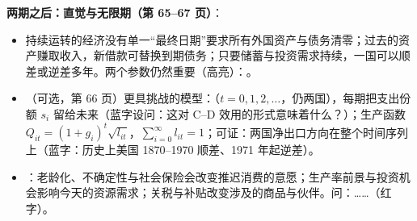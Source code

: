 \textbf{两期之后：直觉与无限期（第 65--67 页）}：
\begin{itemize}
  \item 持续运转的经济没有单一``最终日期''要求所有外国资产与债务清零；过去的资产赚取收入，新借款可替换到期债务；只要储蓄与投资需求持续，一国可以顺差或逆差多年。两个参数仍然重要（高亮）：。
  \item （可选，第 66 页）更具挑战的模型：（$t = 0, 1, 2, \dots$，仍两国），每期把支出份额 $s_i$ 留给未来（蓝字设问：这对 C--D 效用的形式意味着什么？）；生产函数 $Q_{it} = (1 + g_i)^t \sqrt{l_{it}}$，$\sum_{i=0}^{\infty} l_{it} = 1$；可证：两国净出口方向在整个时间序列上（蓝字：历史上美国 1870--1970 顺差、1971 年起逆差）。
  \item {}：老龄化、不确定性与社会保险会改变推迟消费的意愿；生产率前景与投资机会影响今天的资源需求；关税与补贴改变涉及的商品与伙伴。问：……（红字）。
\end{itemize}

